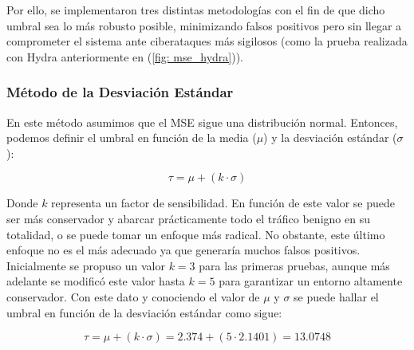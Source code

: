 \documentclass[12pt]{article}
\numberwithin{equation}{section} %
\begin{document}
    \vspace{5mm}

    Por ello, se implementaron tres distintas metodologías con el fin de que dicho umbral sea lo más robusto posible, minimizando falsos positivos pero sin llegar a comprometer el sistema ante ciberataques más sigilosos (como la prueba realizada con Hydra anteriormente en (\ref{fig: mse_hydra})).

    \vspace{10mm}

    \subsubsection{Método de la Desviación Estándar}\label{subsubsec: metodo_desviacion_estandar}

    \vspace{5mm}

    En este método asumimos que el MSE sigue una distribución normal. Entonces, podemos definir el umbral en función de la media ($\mu$) y la desviación estándar ($\sigma$):

    \vspace{2.5mm}

    \begin{equation}
        \tau = \mu + \left( k \cdot \sigma \right)
    \end{equation}

    \vspace{2.5mm}

    Donde $k$ representa un factor de sensibilidad. En función de este valor se puede ser más conservador y abarcar prácticamente todo el tráfico benigno en su totalidad, o se puede tomar un enfoque más radical. No obstante, este último enfoque no es el más adecuado ya que generaría muchos falsos positivos. Inicialmente se propuso un valor $k = 3$ para las primeras pruebas, aunque más adelante se modificó este valor hasta $k = 5$ para garantizar un entorno altamente conservador. Con este dato y conociendo el valor de $\mu$ y $\sigma$ se puede hallar el umbral en función de la desviación estándar como sigue:

    \vspace{2.5mm}

    \begin{equation*}
        \tau = \mu + \left( k \cdot \sigma \right) = 2.374 + \left( 5 \cdot 2.1401 \right) = 13.0748
    \end{equation*}

    \vspace{2.5mm}
\end{document}
